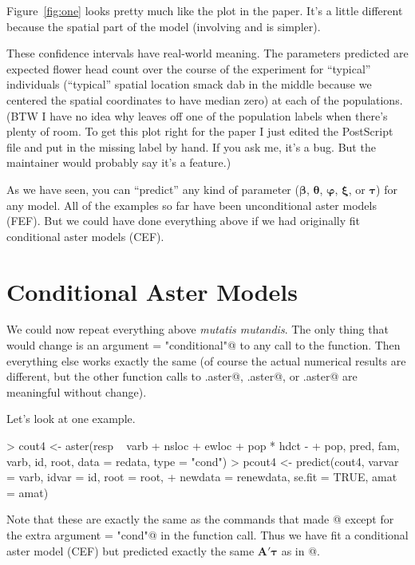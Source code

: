 \documentclass[11pt]{article}
\newcommand{\boldbeta}{{\boldsymbol{\beta}}}
\newcommand{\boldtheta}{{\boldsymbol{\theta}}}
\newcommand{\boldxi}{{\boldsymbol{\xi}}}
\newcommand{\boldtau}{{\boldsymbol{\tau}}}
\newcommand{\boldvarphi}{{\boldsymbol{\varphi}}}
\newcommand{\boldA}{{\mathbf{A}}}
\begin{document}
Figure~\ref{fig:one} looks pretty much like the plot in the paper.
It's a little different because the spatial part of the model (involving
\verb@ewloc@ and \verb@nsloc@ is simpler).

These confidence intervals have real-world meaning.  The parameters predicted
are expected flower head count over the course
of the experiment for ``typical'' individuals (``typical'' spatial location
smack dab in the middle because we centered the spatial coordinates to
have median zero) at each of the populations.
(BTW I have no idea why \verb@axis@
leaves off one of the population labels when there's plenty of room.
To get this
plot right for the paper I just edited the PostScript file and put in the
missing label by hand.  If you ask me, it's a bug.  But the \verb@axis@
maintainer would probably say it's a feature.)

As we have seen, you can ``predict'' any kind of parameter
($\boldbeta$, $\boldtheta$, $\boldvarphi$, $\boldxi$, or $\boldtau$)
for any model.  All of the examples so far have been unconditional
aster models (FEF).  But we could have done everything above if
we had originally fit conditional aster models (CEF).

\section{Conditional Aster Models} \label{sec:conditional}

We could now repeat everything above \emph{mutatis mutandis}.
The only thing that would change is an argument \verb@type = "conditional"@
to any call to the \verb@aster@ function.  Then everything else works
exactly the same (of course the actual numerical results are different,
but the other function calls to \verb@summary.aster@, \verb@anova.aster@,
or \verb@predict.aster@ are meaningful without change).

Let's look at one example.
\begin{Schunk}
\begin{Sinput}
> cout4 <- aster(resp ~ varb + nsloc + ewloc + pop * hdct - 
+     pop, pred, fam, varb, id, root, data = redata, type = "cond")
> pcout4 <- predict(cout4, varvar = varb, idvar = id, root = root, 
+     newdata = renewdata, se.fit = TRUE, amat = amat)
\end{Sinput}
\end{Schunk}
Note that these are exactly the same as the commands that made
@ except for the extra argument \verb@type = "cond"@
in the \verb@aster@ function call.  Thus we have fit a conditional
aster model (CEF) but predicted exactly the same $\boldA' \boldtau$
as in @.
\end{document}
